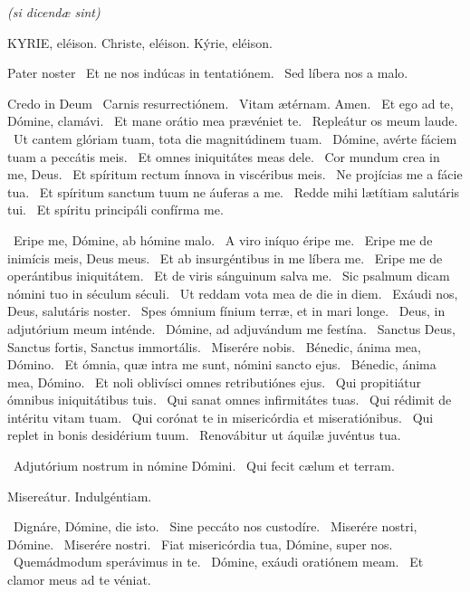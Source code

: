 
\textit{(si dicendæ sint)}

KYRIE, eléison. Christe, eléison. Kýrie, eléison.

Pater noster  \V\ Et ne nos indúcas in tentatiónem. \R\ Sed líbera nos a malo.

Credo in Deum  \V\ Carnis resurrectiónem. \R\ Vitam ætérnam. Amen. \V\ Et ego ad te, Dómine, clamávi. \R\ Et mane orátio mea prævéniet te. \V\ Repleátur os meum laude. \R\ Ut cantem glóriam tuam, tota die magnitúdinem tuam. \V\ Dómine, avérte fáciem tuam a peccátis meis. \R\ Et omnes iniquitátes meas dele. \V\ Cor mundum crea in me, Deus. \R\ Et spíritum rectum ínnova in viscéribus meis. \V\ Ne projícias me a fácie tua. \R\ Et spíritum sanctum tuum ne áuferas a me. \V\ Redde mihi lætítiam salutáris tui. \R\ Et spíritu principáli confírma me.


\V\ Eripe me, Dómine, ab hómine malo. \R\ A viro iníquo éripe me. \V\ Eripe me de inimícis meis, Deus meus. \R\ Et ab insurgéntibus in me líbera me. \V\ Eripe me de operántibus iniquitátem. \R\ Et de viris sánguinum salva me. \V\ Sic psalmum dicam nómini tuo in séculum séculi. \R\ Ut reddam vota mea de die in diem. \V\ Exáudi nos, Deus, salutáris noster. \R\ Spes ómnium fínium terræ, et in mari longe. \V\ Deus, in adjutórium meum inténde. \R\ Dómine, ad adjuvándum me festína. \V\ Sanctus Deus, Sanctus fortis, Sanctus immortális. \R\ Miserére nobis. \V\ Bénedic, ánima mea, Dómino. \R\ Et ómnia, quæ intra me sunt, nómini sancto ejus. \V\ Bénedic, ánima mea, Dómino. \R\ Et noli oblivísci omnes retributiónes ejus. \V\ Qui propitiátur ómnibus iniquitátibus tuis. \R\ Qui sanat omnes infirmitátes tuas. \V\ Qui rédimit de intéritu vitam tuam. \R\ Qui corónat te in misericórdia et miseratiónibus. \V\ Qui replet in bonis desidérium tuum. \R\ Renovábitur ut áquilæ juvéntus tua.


\V\ Adjutórium nostrum in nómine Dómini. \R\ Qui fecit cælum et terram.

 Misereátur. Indulgéntiam.

\V\ Dignáre, Dómine, die isto. \R\ Sine peccáto nos custodíre. \V\ Miserére nostri, Dómine. \R\ Miserére nostri. \V\ Fiat misericórdia tua, Dómine, super nos. \R\ Quemádmodum sperávimus in te. \V\ Dómine, exáudi oratiónem meam. \R\ Et clamor meus ad te véniat.

